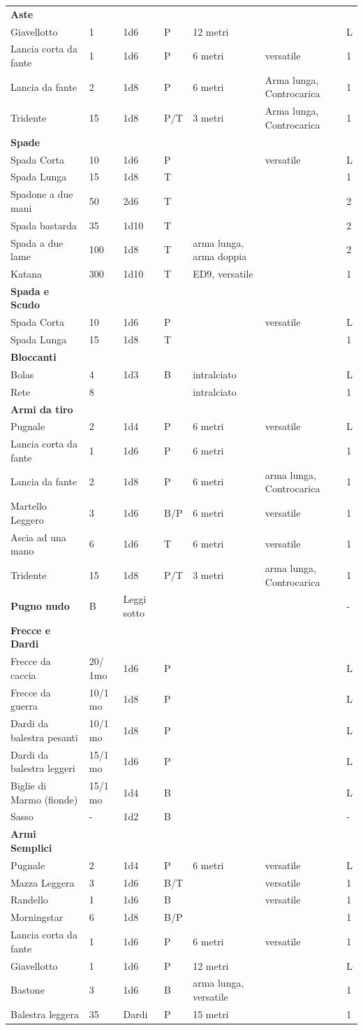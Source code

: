 \documentclass[a4paper,11pt,twoside,openany]{book}
\begin{document}
{\begin{longtable}{|L{3.5cm} |k{1,3cm} |k{1.5cm}| k{1.3cm} |L{3.2cm} |k{2.7cm}|k{2cm}|}
			\textbf{Aste} & & & & & &\tabularnewline
			Giavellotto & 1 & 1d6 & P & 12 metri & &L\tabularnewline
			Lancia corta da fante & 1 & 1d6 & P & 6 metri & versatile&1\tabularnewline
			Lancia da fante & 2 & 1d8 & P & 6 metri &Arma lunga, Controcarica&1 \tabularnewline
			Tridente & 15 & 1d8 & P/T & 3 metri & Arma lunga, Controcarica &1\tabularnewline
			\textbf{Spade} & & & & & &\tabularnewline
			Spada Corta & 10 & 1d6 & P & & versatile&L\tabularnewline
			Spada Lunga & 15 & 1d8 & T & &&1 \tabularnewline
			Spadone a due mani & 50 & 2d6 & T & & &2\tabularnewline
			Spada bastarda & 35 & 1d10 & T & & &2\tabularnewline
			Spada a due lame & 100 & 1d8 & T & arma lunga, arma doppia & &2\tabularnewline
			Katana & 300 & 1d10 & T & ED9, versatile & &1\tabularnewline
			\textbf{Spada e Scudo} & & & & & &\tabularnewline
			Spada Corta & 10 & 1d6 & P & & versatile&L\tabularnewline
			Spada Lunga & 15 & 1d8 & T & & &1\tabularnewline
			\textbf{Bloccanti} & & & & & &\tabularnewline
			Bolas & 4 & 1d3 & B & intralciato & &L\tabularnewline
			Rete & 8 & & & intralciato & &1\tabularnewline
			\textbf{Armi da tiro} & & & & && \tabularnewline
			Pugnale & 2 & 1d4 & P & 6 metri & versatile&L\tabularnewline
			Lancia corta da fante & 1 & 1d6 & P & 6 metri & &1\tabularnewline
			Lancia da fante & 2 & 1d8 & P & 6 metri &arma lunga, Controcarica&1\tabularnewline
			Martello Leggero & 3 & 1d6 & B/P & 6 metri & versatile&1\tabularnewline
			Ascia ad una mano & 6 & 1d6 & T & 6 metri & versatile&1\tabularnewline
			Tridente & 15 & 1d8 & P/T & 3 metri&arma lunga, Controcarica &1\tabularnewline
			\textbf{Pugno nudo} & B & Leggi sotto & & & &-\tabularnewline
			\textbf{Frecce e Dardi} & & & & & &\tabularnewline
			Frecce da caccia & 20/ 1mo & 1d6 & P & & &L\tabularnewline
			Frecce da guerra & 10/1 mo & 1d8 & P & & &L\tabularnewline
			Dardi da balestra pesanti & 10/1 mo & 1d8 & P & & &L\tabularnewline
			Dardi da balestra leggeri & 15/1 mo & 1d6 & P & & &L\tabularnewline
			Biglie di Marmo (fionde) & 15/1 mo & 1d4 & B & & &L\tabularnewline
			Sasso & - & 1d2 & B & & &-\tabularnewline
			\textbf{Armi Semplici} & & & & & &\tabularnewline
			Pugnale & 2 & 1d4 & P & 6 metri & versatile&L\tabularnewline
			Mazza Leggera & 3 & 1d6 & B/T & & versatile&1\tabularnewline
			Randello & 1 & 1d6 & B & & versatile&1\tabularnewline
			Morningstar & 6 & 1d8 & B/P & & &1\tabularnewline
			Lancia corta da fante & 1 & 1d6 & P & 6 metri & versatile&1\tabularnewline
			Giavellotto & 1 & 1d6 & P & 12 metri & &L\tabularnewline
			Bastone & 3 & 1d6 & B & arma lunga, versatile & &1\tabularnewline
			Balestra leggera & 35 & Dardi & P & 15 metri & &1\tabularnewline
		\end{longtable}
		
}
\end{document}
